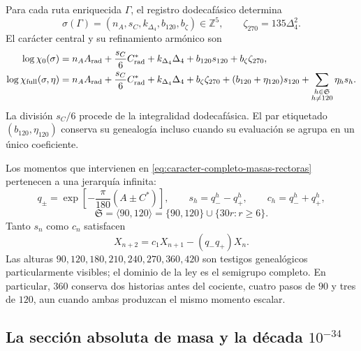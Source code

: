 Para cada ruta enriquecida \(\Gamma\), el registro dodecafásico determina
\begin{equation}
 \sigma(\Gamma)
 =(n_A,s_C,k_{\Delta_4},b_{120},b_\zeta)\in\mathbb Z^5,
 \qquad \zeta_{270}=135\Delta_4^2.
 \label{eq:firma-z5-masas-rectoras}
\end{equation}
El carácter central y su refinamiento armónico son
\begin{align}
 \log\chi_0(\sigma)
 &=n_A A_{\rm rad}+\frac{s_C}{6}C^*_{\rm rad}
   +k_{\Delta_4}\Delta_4+b_{120}s_{120}+b_\zeta\zeta_{270},
 \label{eq:caracter-central-masas-rectoras}\\
 \log\chi_{\rm full}(\sigma,\eta)
 &=n_A A_{\rm rad}+\frac{s_C}{6}C^*_{\rm rad}
   +k_{\Delta_4}\Delta_4+b_\zeta\zeta_{270}
   +(b_{120}+\eta_{120})s_{120}
   +\sum_{\substack{h\in\mathfrak S\\h\ne120}}\eta_hs_h.
 \label{eq:caracter-completo-masas-rectoras}
\end{align}
La división \(s_C/6\) procede de la integralidad dodecafásica. El par etiquetado
\((b_{120},\eta_{120})\) conserva su genealogía incluso cuando su evaluación se
agrupa en un único coeficiente.

Los momentos que intervienen en
\eqref{eq:caracter-completo-masas-rectoras} pertenecen a una jerarquía infinita:
\begin{equation}
 q_\pm=\exp\!\left[-\frac{\pi}{180}(A\pm C^*)\right],
 \qquad s_h=q_-^h-q_+^h,\qquad c_h=q_-^h+q_+^h,
 \label{eq:momentos-torres-masas-rectoras}
\end{equation}
\begin{equation}
 \mathfrak S=\langle90,120\rangle
 =\{90,120\}\cup\{30r:r\ge6\}.
 \label{eq:semigrupo-global-torres-masas-rectoras}
\end{equation}
Tanto \(s_n\) como \(c_n\) satisfacen
\begin{equation}
 X_{n+2}=c_1X_{n+1}-(q_-q_+)X_n.
 \label{eq:recurrencia-torres-masas-rectoras}
\end{equation}
Las alturas \(90,120,180,210,240,270,360,420\) son testigos genealógicos
particularmente visibles; el dominio de la ley es el semigrupo completo. En
particular, \(360\) conserva dos historias antes del cociente, cuatro pasos de
\(90\) y tres de \(120\), aun cuando ambas produzcan el mismo momento escalar.

\subsection{La sección absoluta de masa y la década \texorpdfstring{\(10^{-34}\)}{10⁻³⁴}}

